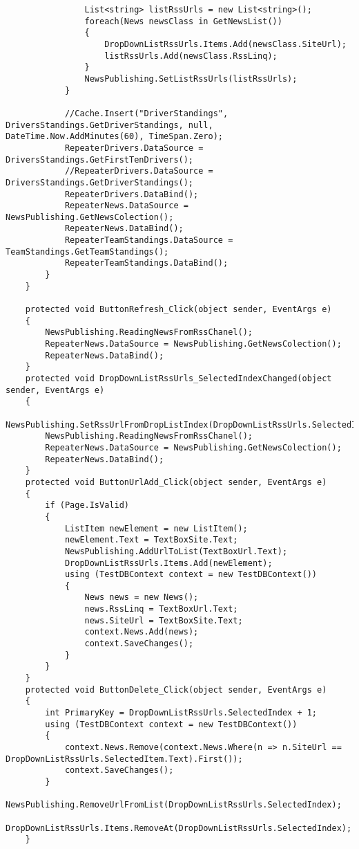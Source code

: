 \documentclass[14pt,a4paper]{extreport}
\begin{document}
\begin{landscape}
\begin{lstlisting}
                List<string> listRssUrls = new List<string>();
                foreach(News newsClass in GetNewsList())
                {
                    DropDownListRssUrls.Items.Add(newsClass.SiteUrl);
                    listRssUrls.Add(newsClass.RssLinq);
                }
                NewsPublishing.SetListRssUrls(listRssUrls);
            }

            //Cache.Insert("DriverStandings", DriversStandings.GetDriverStandings, null, DateTime.Now.AddMinutes(60), TimeSpan.Zero);
            RepeaterDrivers.DataSource = DriversStandings.GetFirstTenDrivers();
            //RepeaterDrivers.DataSource = DriversStandings.GetDriverStandings();
            RepeaterDrivers.DataBind();
            RepeaterNews.DataSource = NewsPublishing.GetNewsColection();
            RepeaterNews.DataBind();
            RepeaterTeamStandings.DataSource = TeamStandings.GetTeamStandings();
            RepeaterTeamStandings.DataBind();
        }
    }

    protected void ButtonRefresh_Click(object sender, EventArgs e)
    {
        NewsPublishing.ReadingNewsFromRssChanel();
        RepeaterNews.DataSource = NewsPublishing.GetNewsColection();
        RepeaterNews.DataBind();
    }
    protected void DropDownListRssUrls_SelectedIndexChanged(object sender, EventArgs e)
    {
        NewsPublishing.SetRssUrlFromDropListIndex(DropDownListRssUrls.SelectedIndex);
        NewsPublishing.ReadingNewsFromRssChanel();
        RepeaterNews.DataSource = NewsPublishing.GetNewsColection();
        RepeaterNews.DataBind();
    }
    protected void ButtonUrlAdd_Click(object sender, EventArgs e)
    {
        if (Page.IsValid)
        {
            ListItem newElement = new ListItem();
            newElement.Text = TextBoxSite.Text;
            NewsPublishing.AddUrlToList(TextBoxUrl.Text);
            DropDownListRssUrls.Items.Add(newElement);
            using (TestDBContext context = new TestDBContext())
            {
                News news = new News();
                news.RssLinq = TextBoxUrl.Text;
                news.SiteUrl = TextBoxSite.Text;
                context.News.Add(news);
                context.SaveChanges();
            }
        }
    }
    protected void ButtonDelete_Click(object sender, EventArgs e)
    {
        int PrimaryKey = DropDownListRssUrls.SelectedIndex + 1;
        using (TestDBContext context = new TestDBContext())
        {
            context.News.Remove(context.News.Where(n => n.SiteUrl == DropDownListRssUrls.SelectedItem.Text).First());
            context.SaveChanges();
        }
        NewsPublishing.RemoveUrlFromList(DropDownListRssUrls.SelectedIndex);
        DropDownListRssUrls.Items.RemoveAt(DropDownListRssUrls.SelectedIndex);
    }


\end{lstlisting}
\end{landscape}
\end{document}
